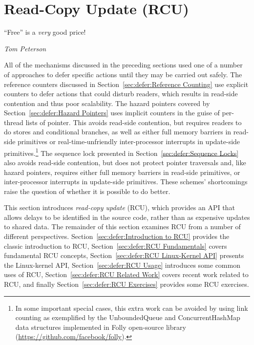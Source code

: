 
\section{Read-Copy Update (RCU)}
\label{sec:defer:Read-Copy Update (RCU)}
%
\epigraph{``Free'' is a \emph{very} good price!}{\emph{Tom Peterson}}

All of the mechanisms discussed in the preceding sections
used one of a number of approaches to defer specific actions
until they may be carried out safely.
The reference counters discussed in
Section~\ref{sec:defer:Reference Counting}
use explicit counters to defer actions that could disturb readers,
which results in read-side contention and thus poor scalability.
The hazard pointers covered by
Section~\ref{sec:defer:Hazard Pointers}
uses implicit counters in the guise of per-thread lists of pointer.
This avoids read-side contention, but requires readers to do stores and
conditional branches, as well as either full memory barriers in read-side
primitives or real-time-unfriendly inter-processor interrupts in
update-side primitives.\footnote{
	In some important special cases, this extra work can be avoided
	by using link counting as exemplified by the UnboundedQueue
	and ConcurrentHashMap data structures implemented in Folly
	open-source library
	(\url{https://github.com/facebook/folly}).}
The sequence lock presented in
Section~\ref{sec:defer:Sequence Locks}
also avoids read-side contention, but does not protect pointer
traversals and, like hazard pointers, requires either full memory barriers
in read-side primitives, or inter-processor interrupts in update-side
primitives.
These schemes' shortcomings raise the question of
whether it is possible to do better.

This section introduces \emph{read-copy update} (RCU), which provides
an API that allows delays to be identified in the source code,
rather than as expensive updates to shared data.
The remainder of this
section examines RCU from a number of different perspectives.
Section~\ref{sec:defer:Introduction to RCU} provides the classic
introduction to RCU,
Section~\ref{sec:defer:RCU Fundamentals} covers fundamental RCU
concepts,
Section~\ref{sec:defer:RCU Linux-Kernel API} presents the Linux-kernel
API,
Section~\ref{sec:defer:RCU Usage} introduces some common uses of RCU,
Section~\ref{sec:defer:RCU Related Work} covers recent work related
to RCU,
and finally
Section~\ref{sec:defer:RCU Exercises} provides some RCU exercises.






